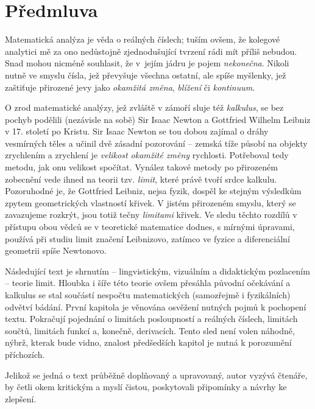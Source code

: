 \chapter*{Předmluva}

Matematická analýza je věda o reálných číslech; tuším ovšem, že kolegové
analytici mě za ono nedůstojně zjednodušující tvrzení rádi mít příliš nebudou.
Snad mohou nicméně souhlasit, že v~jejím jádru je pojem \emph{nekonečna}. Nikoli
nutně ve smyslu čísla, jež převyšuje všechna ostatní, ale spíše myšlenky, jež
zaštiťuje přirozené jevy jako \emph{okamžitá změna}, \emph{blížení} či
\emph{kontinuum}.

O zrod matematické analýzy, jež zvláště v zámoří sluje též \emph{kalkulus}, se
bez pochyb podělili (nezávisle na sobě) Sir Isaac Newton a Gottfried Wilhelm
Leibniz v 17. století po Kristu. Sir Isaac Newton se tou dobou zajímal o dráhy
vesmírných těles a učinil dvě zásadní pozorování -- zemská tíže působí na
objekty zrychlením a zrychlení je \emph{velikost okamžité změny} rychlosti.
Potřeboval tedy metodu, jak onu velikost spočítat. Vynález takové metody po
přirozeném zobecnění vede ihned na teorii tzv. \emph{limit}, které právě tvoří
srdce kalkulu. Pozoruhodné je, že Gottfried Leibniz, nejsa fyzik, dospěl ke
stejným výsledkům zpytem geometrických vlastností křivek. V jistém přirozeném
smyslu, který se zavazujeme rozkrýt, jsou totiž tečny \emph{limitami} křivek. Ve
sledu těchto rozdílů v přístupu obou vědců se v teoretické matematice dodnes, s
mírnými úpravami, používá při studiu limit značení Leibnizovo, zatímco ve fyzice
a diferenciální geometrii spíše Newtonovo.

Následující text je shrnutím -- lingvistickým, vizuálním a didaktickým
pozlacením -- teorie limit. Hloubka i šíře této teorie ovšem přesáhla původní
očekávání a kalkulus se stal součástí nespočtu matematických (samozřejmě i
fyzikálních) odvětví bádání. První kapitola je věnována osvěžení nutných pojmů k
pochopení textu. Pokračují pojednání o limitách posloupností a reálných číslech,
limitách součtů, limitách funkcí a, konečně, derivacích. Tento sled není volen
náhodně, nýbrž, kterak bude vidno, znalost předšedších kapitol je nutná k
porozumění příchozích.

Jelikož se jedná o text průběžně doplňovaný a upravovaný, autor vyzývá čtenáře,
by četli okem kritickým a myslí čistou, poskytovali připomínky a návrhy ke
zlepšení.
